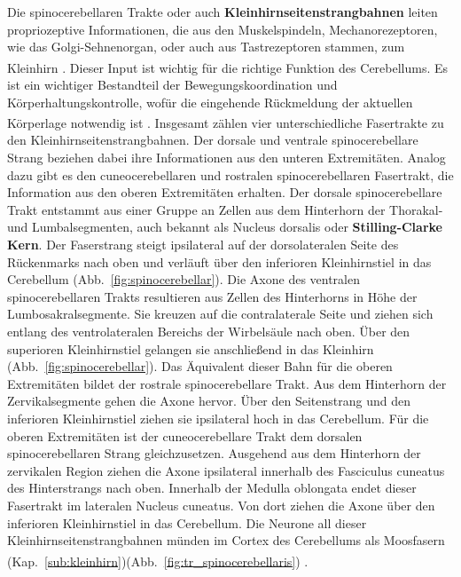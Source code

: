 \documentclass[12pt,a4paper,pdftex]{article}
\begin{document}
Die spinocerebellaren Trakte oder auch \textbf{Kleinhirnseitenstrangbahnen} leiten propriozeptive Informationen, die aus den Muskelspindeln, Mechanorezeptoren, wie das Golgi-Sehnenorgan, oder auch aus Tastrezeptoren stammen, zum Kleinhirn \textsuperscript{\cite[8]{crossman2014neuroanatomy}}. Dieser Input ist wichtig für die richtige Funktion des Cerebellums. Es ist ein wichtiger Bestandteil der Bewegungskoordination und Körperhaltungskontrolle, wofür die eingehende Rückmeldung der aktuellen Körperlage notwendig ist \textsuperscript{\cite[3]{trepel2011neuroanatomie}}. Insgesamt zählen vier unterschiedliche Fasertrakte zu den Kleinhirnseitenstrangbahnen. Der dorsale und ventrale spinocerebellare Strang beziehen dabei ihre Informationen aus den unteren Extremitäten. Analog dazu gibt es den cuneocerebellaren und rostralen spinocerebellaren Fasertrakt, die Information aus den oberen Extremitäten erhalten. Der dorsale spinocerebellare Trakt entstammt aus einer Gruppe an Zellen aus dem Hinterhorn der Thorakal- und Lumbalsegmenten, auch bekannt als Nucleus dorsalis oder \textbf{Stilling-Clarke Kern}. Der Faserstrang steigt ipsilateral auf der dorsolateralen Seite des Rückenmarks nach oben und verläuft über den inferioren Kleinhirnstiel in das Cerebellum (Abb.~\ref{fig:spinocerebellar}). Die Axone des ventralen spinocerebellaren Trakts resultieren aus Zellen des Hinterhorns in Höhe der Lumbosakralsegmente. Sie kreuzen auf die contralaterale Seite und ziehen sich entlang des ventrolateralen Bereichs der Wirbelsäule nach oben. Über den superioren Kleinhirnstiel gelangen sie anschließend in das Kleinhirn (Abb.~\ref{fig:spinocerebellar}). Das Äquivalent dieser Bahn für die oberen Extremitäten bildet der rostrale spinocerebellare Trakt. Aus dem Hinterhorn der Zervikalsegmente gehen die Axone hervor. Über den Seitenstrang und den inferioren Kleinhirnstiel ziehen sie ipsilateral hoch in das Cerebellum. Für die oberen Extremitäten ist der cuneocerebellare Trakt dem dorsalen spinocerebellaren Strang gleichzusetzen. Ausgehend aus dem Hinterhorn der zervikalen Region ziehen die Axone ipsilateral innerhalb des Fasciculus cuneatus des Hinterstrangs nach oben. Innerhalb der Medulla oblongata endet dieser Fasertrakt im lateralen Nucleus cuneatus. Von dort ziehen die Axone über den inferioren Kleinhirnstiel in das Cerebellum. Die Neurone all dieser Kleinhirnseitenstrangbahnen münden im Cortex des Cerebellums als Moosfasern (Kap.~\ref{sub:kleinhirn})(Abb.~\ref{fig:tr_spinocerebellaris}) \textsuperscript{\cite[8]{crossman2014neuroanatomy}}.          
\end{document}
